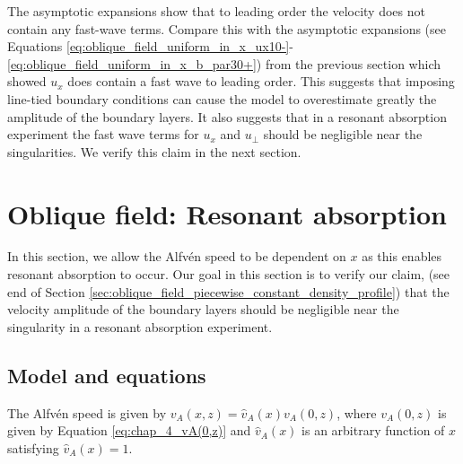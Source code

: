 The asymptotic expansions show that to leading order the velocity does not contain any fast-wave terms. Compare this with the asymptotic expansions (see Equations \ref{eq:oblique_field_uniform_in_x_ux10-}-\ref{eq:oblique_field_uniform_in_x_b_par30+}) from the previous section which showed $u_x$ does contain a fast wave to leading order. This suggests that imposing line-tied boundary conditions can cause the model to overestimate greatly the amplitude of the boundary layers. It also suggests that in a resonant absorption experiment the fast wave terms for $u_x$ and $u_\perp$ should be negligible near the singularities. We verify this claim in the next section. 

\section{Oblique field: Resonant absorption}
\label{sec:oblique_field_resonant_absorption}

In this section, we allow the Alfv\'en speed to be dependent on $x$ as this enables resonant absorption to occur. Our goal in this section is to verify our claim, (see end of Section \ref{sec:oblique_field_piecewise_constant_density_profile}) that the velocity amplitude of the boundary layers should be negligible near the singularity in a resonant absorption experiment.

\subsection{Model and equations}

The Alfv\'en speed is given by $v_A(x,z)=\hat{v}_A(x)v_A(0,z)$, where $v_A(0,z)$ is given by Equation \eqref{eq:chap_4_vA(0,z)} and $\hat{v}_A(x)$ is an arbitrary function of $x$ satisfying $\hat{v}_A(x)=1$. 

